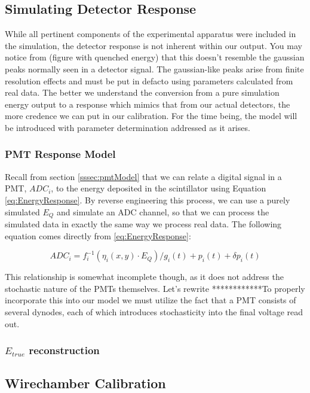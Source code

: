 \subsection{Simulating Detector Response}
While all pertinent components of the experimental apparatus were included
in the simulation, the detector response is not inherent within our
output. You may notice from (figure with quenched energy) that this
doesn't resemble the gaussian peaks normally seen in a detector signal.
The gaussian-like peaks arise from finite resolution effects and
must be put in defacto using parameters calculated
from real data. The better we understand the conversion from a pure simulation
energy output to a response which mimics that from our actual detectors, the
more credence we can put in our calibration. For the time being, the model will
be introduced with parameter determination addressed as it arises. 

\subsubsection{PMT Response Model}

Recall from section \ref{sssec:pmtModel} that we can relate a digital signal
in a PMT, $ADC_i$, to the energy deposited in the scintillator
using Equation \ref{eq:EnergyResponse}.
By reverse engineering this process, we can use a purely simulated $E_Q$ and
simulate an ADC channel, so that we can process the simulated data in
exactly the same way we process real data. The following equation comes directly
from \ref{eq:EnergyResponse}:

\begin{equation} \label{eq:pmtResponse}
ADC_i = f_i^{-1}\left(\eta_i(x,y) \cdot E_{Q} \right)/g_i(t) + p_i(t) + \delta p_i(t) 
\end{equation}

This relationship is somewhat incomplete though, as it does not address the
stochastic nature of the PMTs themselves. Let's rewrite ************To properly incorporate this into our
model we must utilize the fact that a PMT consists of several dynodes, each of which
introduces stochasticity into the final voltage read out. 

\subsubsection{$E_{true}$ reconstruction}

\subsection{Wirechamber Calibration}

